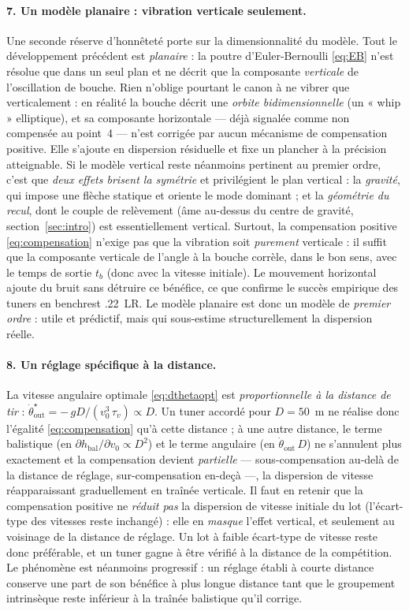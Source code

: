 \documentclass[12pt,a4paper]{article}
\begin{document}
	\paragraph{7. Un modèle planaire : vibration verticale seulement.} Une seconde réserve d'honnêteté porte sur la dimensionnalité du modèle. Tout le développement précédent est \emph{planaire} : la poutre d'Euler-Bernoulli \eqref{eq:EB} n'est résolue que dans un seul plan et ne décrit que la composante \emph{verticale} de l'oscillation de bouche. Rien n'oblige pourtant le canon à ne vibrer que verticalement : en réalité la bouche décrit une \emph{orbite bidimensionnelle} (un « whip » elliptique), et sa composante horizontale — déjà signalée comme non compensée au point~4 — n'est corrigée par aucun mécanisme de compensation positive. Elle s'ajoute en dispersion résiduelle et fixe un plancher à la précision atteignable. Si le modèle vertical reste néanmoins pertinent au premier ordre, c'est que \emph{deux effets brisent la symétrie} et privilégient le plan vertical : la \emph{gravité}, qui impose une flèche statique et oriente le mode dominant ; et la \emph{géométrie du recul}, dont le couple de relèvement (âme au-dessus du centre de gravité, section~\ref{sec:intro}) est essentiellement vertical. Surtout, la compensation positive \eqref{eq:compensation} n'exige pas que la vibration soit \emph{purement} verticale : il suffit que la composante verticale de l'angle à la bouche corrèle, dans le bon sens, avec le temps de sortie $t_b$ (donc avec la vitesse initiale). Le mouvement horizontal ajoute du bruit sans détruire ce bénéfice, ce que confirme le succès empirique des tuners en benchrest .22~LR. Le modèle planaire est donc un modèle de \emph{premier ordre} : utile et prédictif, mais qui sous-estime structurellement la dispersion réelle.

	\paragraph{8. Un réglage spécifique à la distance.} La vitesse angulaire optimale \eqref{eq:dthetaopt} est \emph{proportionnelle à la distance de tir} : $\dot\theta_\text{out}^\star = -\,gD/(v_0^3\,\tau_v) \propto D$. Un tuner accordé pour $D = 50$~m ne réalise donc l'égalité \eqref{eq:compensation} qu'à cette distance ; à une autre distance, le terme balistique (en $\partial h_\text{bal}/\partial v_0 \propto D^2$) et le terme angulaire (en $\dot\theta_\text{out}\,D$) ne s'annulent plus exactement et la compensation devient \emph{partielle} --- sous-compensation au-delà de la distance de réglage, sur-compensation en-deçà ---, la dispersion de vitesse réapparaissant graduellement en traînée verticale. Il faut en retenir que la compensation positive ne \emph{réduit pas} la dispersion de vitesse initiale du lot (l'écart-type des vitesses reste inchangé) : elle en \emph{masque} l'effet vertical, et seulement au voisinage de la distance de réglage. Un lot à faible écart-type de vitesse reste donc préférable, et un tuner gagne à être vérifié à la distance de la compétition. Le phénomène est néanmoins progressif : un réglage établi à courte distance conserve une part de son bénéfice à plus longue distance tant que le groupement intrinsèque reste inférieur à la traînée balistique qu'il corrige.
\end{document}
